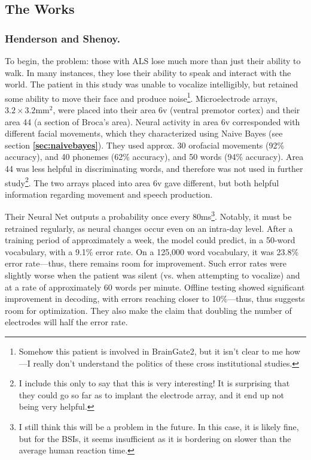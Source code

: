 \subsection{The Works}

\subsubsection{Henderson and Shenoy.}

To begin, the problem: those with ALS lose much more than just their ability to walk. In many instances, they lose their ability to speak and interact with the world. The patient in this study was unable to vocalize intelligibly, but retained some ability to move their face and produce noise\footnote{Somehow this patient is involved in BrainGate2, but it isn't clear to me how---I really don't understand the politics of these cross institutional studies.}. Microelectrode arrays, $3.2 \times 3.2 \mathrm{mm}^2$, were placed into their area 6v (ventral premotor cortex) and their area 44 (a section of Broca's area). Neural activity in area 6v corresponded with different facial movements, which they characterized using Naive Bayes (see section \textbf{\ref{sec:naivebayes}}). They used approx. 30 orofacial movements (92\% accuracy), and 40 phonemes (62\% accuracy), and 50 words (94\% accuracy). Area 44 was less helpful in discriminating words, and therefore was not used in further study\footnote{I include this only to say that this is very interesting! It is surprising that they could go so far as to implant the electrode array, and it end up not being very helpful.}. The two arrays placed into area 6v gave different, but both helpful information regarding movement and speech production.\newline

Their Neural Net outputs a probability once every 80ms\footnote{I still think this will be a problem in the future. In this case, it is likely fine, but for the BSIs, it seems insufficient as it is bordering on slower than the average human reaction time.}. Notably, it must be retrained regularly, as neural changes occur even on an intra-day level. After a training period of approximately a week, the model could predict, in a 50-word vocabulary, with a 9.1\% error rate. On a 125,000 word vocabulary, it was 23.8\% error rate---thus, there remains room for improvement. Such error rates were slightly worse when the patient was silent (vs. when attempting to vocalize) and at a rate of approximately 60 words per minute. Offline testing showed significant improvement in decoding, with errors reaching closer to 10\%---thus, thus suggests room for optimization. They also make the claim that doubling the number of electrodes will half the error rate. \newline

